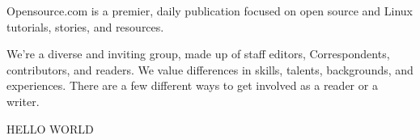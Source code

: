 \documentclass{article}
\begin{document}
Opensource.com is a premier, daily publication focused on
open source and Linux tutorials, stories, and resources.

We're a diverse and inviting group, made up of staff
editors, Correspondents, contributors, and readers. We
value differences in skills, talents, backgrounds, and
experiences. There are a few different ways to get involved
as a reader or a writer.

HELLO WORLD
\end{document}
